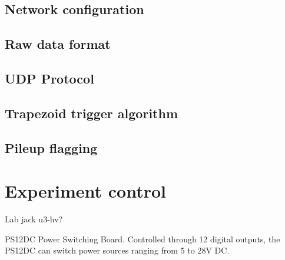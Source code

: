 
\subsection{Network configuration}



\subsection{Raw data format}



\subsection{UDP Protocol}



\subsection{Trapezoid trigger algorithm}



\subsection{Pileup flagging}



\section{Experiment control}


Lab jack u3-hv?

PS12DC Power Switching Board. Controlled through 12 digital outputs, the PS12DC can switch power sources ranging from 5 to 28V DC.

